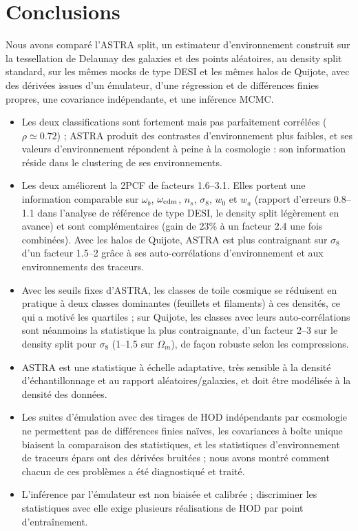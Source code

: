 \documentclass[11pt,twocolumn]{article}
\begin{document}
\section{Conclusions}

Nous avons comparé l'ASTRA split, un estimateur d'environnement construit sur la tessellation de Delaunay des galaxies et des points aléatoires, au density split standard, sur les mêmes mocks de type DESI et les mêmes halos de Quijote, avec des dérivées issues d'un émulateur, d'une régression et de différences finies propres, une covariance indépendante, et une inférence MCMC.
\begin{itemize}
\item Les deux classifications sont fortement mais pas parfaitement corrélées ($\rho\simeq0.72$) ; ASTRA produit des contrastes d'environnement plus faibles, et ses valeurs d'environnement répondent à peine à la cosmologie : son information réside dans le clustering de ses environnements.
\item Les deux améliorent la 2PCF de facteurs 1.6--3.1. Elles portent une information comparable sur $\omega_b$, $\omega_{\rm cdm}$, $n_s$, $\sigma_8$, $w_0$ et $w_a$ (rapport d'erreurs 0.8--1.1 dans l'analyse de référence de type DESI, le density split légèrement en avance) et sont complémentaires (gain de 23\% à un facteur 2.4 une fois combinées). Avec les halos de Quijote, ASTRA est plus contraignant sur $\sigma_8$ d'un facteur 1.5--2 grâce à ses auto-corrélations d'environnement et aux environnements des traceurs.
\item Avec les seuils fixes d'ASTRA, les classes de toile cosmique se réduisent en pratique à deux classes dominantes (feuillets et filaments) à ces densités, ce qui a motivé les quartiles ; sur Quijote, les classes avec leurs auto-corrélations sont néanmoins la statistique la plus contraignante, d'un facteur 2--3 sur le density split pour $\sigma_8$ (1--1.5 sur $\Omega_m$), de façon robuste selon les compressions.
\item ASTRA est une statistique à échelle adaptative, très sensible à la densité d'échantillonnage et au rapport aléatoires/galaxies, et doit être modélisée à la densité des données.
\item Les suites d'émulation avec des tirages de HOD indépendants par cosmologie ne permettent pas de différences finies naïves, les covariances à boîte unique biaisent la comparaison des statistiques, et les statistiques d'environnement de traceurs épars ont des dérivées bruitées ; nous avons montré comment chacun de ces problèmes a été diagnostiqué et traité.
\item L'inférence par l'émulateur est non biaisée et calibrée ; discriminer les statistiques avec elle exige plusieurs réalisations de HOD par point d'entraînement.
\end{itemize}
\end{document}
